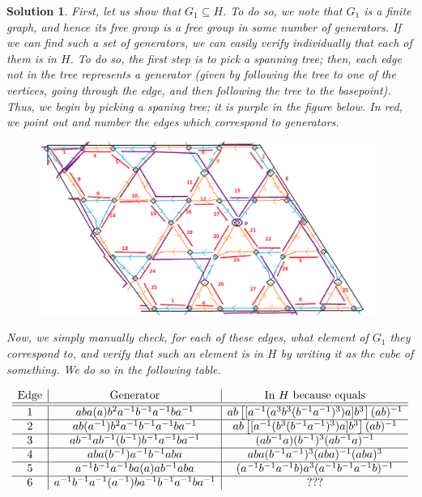 \documentclass{article}
\theoremstyle{plain}
\theoremstyle{nonumberplain}
\newtheorem{sol}{Solution}
\begin{document}
\begin{sol}
First, let us show that $G_1 \subseteq H$. To do so, we note that $G_1$ is a finite graph, and hence its free group is a free group in some number of generators. If we can find such a set of generators, we can easily verify individually that each of them is in $H$. To do so, the first step is to pick a spanning tree; then, each edge not in the tree represents a generator (given by following the tree to one of the vertices, going through the edge, and then following the tree to the basepoint). Thus, we begin by picking a spaning tree; it is purple in the figure below. In red, we point out and number the edges which correspond to generators.
\begin{figure}[H]
\centering
\includegraphics[width=\linewidth]{cov82}
\end{figure}

Now, we simply manually check, for each of these edges, what element of $G_1$ they correspond to, and verify that such an element is in $H$ by writing it as the cube of something. We do so in the following table.
\begin{center}
\setlength\extrarowheight{0.6ex}
\[
\begin{array}{c | c | c}
\text{Edge} & \text{Generator} & \text{In $H$ because equals} \\
\hline
\hline
1 & aba(a)b^2 a^{-1} b^{-1} a^{-1} b a^{-1} & ab \left[ [a^{-1} (a^3 b^3 (b^{-1} a^{-1})^3) a] b^3 \right] (ab)^{-1} \\
\hline
2 & ab (a^{-1}) b^2 a^{-1} b^{-1} a^{-1} b a^{-1} & ab \left[ [a^{-1} (b^3 (b^{-1} a^{-1})^3) a] b^3 \right] (ab)^{-1} \\
\hline
3 & ab^{-1} a b^{-1} (b^{-1}) b^{-1} a^{-1} b a^{-1} & (a b^{-1} a) (b^{-1})^3 (a b^{-1} a)^{-1} \\
\hline
4 & a b a (b^{-1}) a^{-1} b^{-1} a b a & aba (b^{-1} a^{-1})^3 (aba)^{-1} (aba)^3 \\
\hline
5 & a^{-1} b^{-1} a^{-1} b a (a) a b^{-1} a b a & (a^{-1} b^{-1} a^{-1} b) a^3 (a^{-1} b^{-1} a^{-1} b)^{-1} \\
\hline
6 & a^{-1} b^{-1} a^{-1} (a^{-1}) b a^{-1} b^{-1} a^{-1} b a^{-1} & ???
\end{array}
\]
\end{center}


\end{sol}
\end{document}
